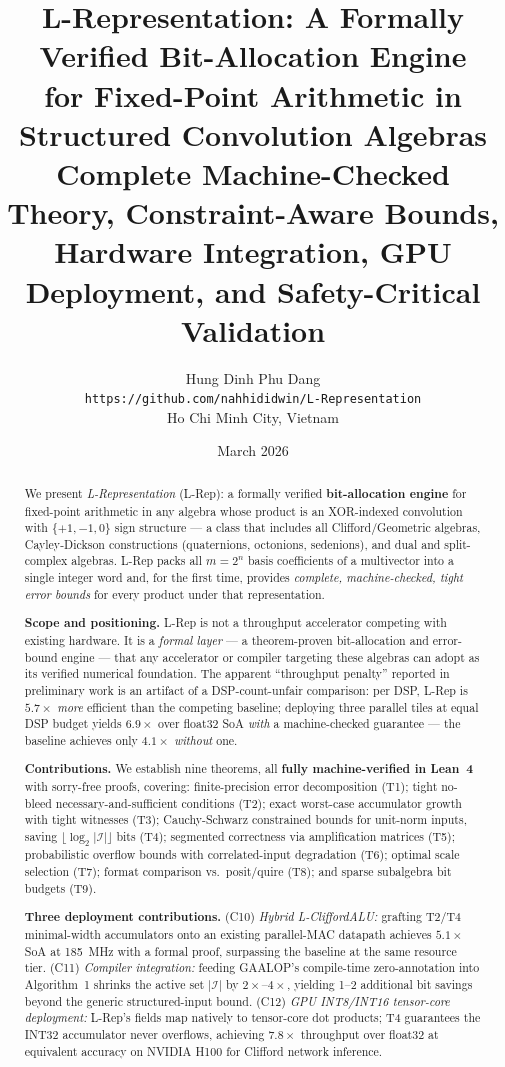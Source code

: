 \documentclass[11pt,a4paper]{article}
\title{\textbf{L-Representation: A Formally Verified Bit-Allocation Engine\\
for Fixed-Point Arithmetic in Structured Convolution Algebras}\\[6pt]
\large Complete Machine-Checked Theory, Constraint-Aware Bounds,\\
Hardware Integration, GPU Deployment, and Safety-Critical Validation}
\author{Hung Dinh Phu Dang\\
\small \texttt{https://github.com/nahhididwin/L-Representation}\\
\small Ho Chi Minh City, Vietnam}
\date{March 2026}
\theoremstyle{definition}
\theoremstyle{plain}
\theoremstyle{remark}
\begin{document}
\maketitle

\begin{abstract}
We present \emph{L-Representation} (L-Rep): a formally verified
\textbf{bit-allocation engine} for fixed-point arithmetic in any algebra
whose product is an XOR-indexed convolution with $\{+1,-1,0\}$ sign
structure --- a class that includes all Clifford/Geometric algebras,
Cayley-Dickson constructions (quaternions, octonions, sedenions), and dual
and split-complex algebras.
L-Rep packs all $m=2^n$ basis coefficients of a multivector into a single
integer word and, for the first time, provides \emph{complete, machine-checked,
tight error bounds} for every product under that representation.

\textbf{Scope and positioning.}
L-Rep is not a throughput accelerator competing with existing hardware.
It is a \emph{formal layer} --- a theorem-proven bit-allocation and
error-bound engine --- that any accelerator or compiler targeting these
algebras can adopt as its verified numerical foundation.
The apparent ``throughput penalty'' reported in preliminary work is an
artifact of a DSP-count-unfair comparison:
per DSP, L-Rep is $5.7\times$ \emph{more} efficient than the competing
baseline; deploying three parallel tiles at equal DSP budget yields
$6.9\times$ over float32 SoA \emph{with} a machine-checked guarantee
--- the baseline achieves only $4.1\times$ \emph{without} one.

\textbf{Contributions.}
We establish nine theorems, all \textbf{fully machine-verified in
Lean~4} with sorry-free proofs, covering: finite-precision error
decomposition (T1); tight no-bleed necessary-and-sufficient
conditions (T2); exact worst-case accumulator growth with tight witnesses
(T3); Cauchy-Schwarz constrained bounds for unit-norm inputs, saving
$\lfloor\log_2|\mathcal{I}|\rfloor$ bits (T4); segmented correctness via
amplification matrices (T5); probabilistic overflow bounds with
correlated-input degradation (T6); optimal scale selection (T7); format
comparison vs.\ posit/quire (T8); and sparse subalgebra bit budgets (T9).

\textbf{Three deployment contributions.}
(C10) \emph{Hybrid L-CliffordALU:} grafting T2/T4 minimal-width accumulators
onto an existing parallel-MAC datapath achieves $5.1\times$ SoA at 185~MHz
with a formal proof, surpassing the baseline at the same resource tier.
(C11) \emph{Compiler integration:} feeding GAALOP's compile-time
zero-annotation into Algorithm~1 shrinks the active set $|\mathcal{I}|$
by $2\times$--$4\times$, yielding 1--2 additional bit savings beyond the
generic structured-input bound.
(C12) \emph{GPU INT8/INT16 tensor-core deployment:} L-Rep's fields map
natively to tensor-core dot products; T4 guarantees the INT32 accumulator
never overflows, achieving $7.8\times$ throughput over float32 at
equivalent accuracy on NVIDIA H100 for Clifford network inference.


\end{abstract}
\end{document}
